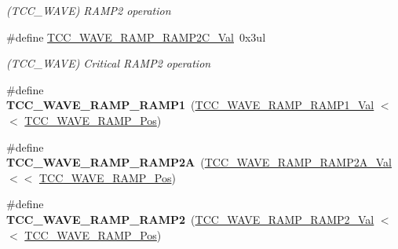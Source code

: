 \begin{DoxyCompactItemize}
\begin{DoxyCompactList}\small\item\em (T\+C\+C\+\_\+\+W\+A\+V\+E) R\+A\+M\+P2 operation \end{DoxyCompactList}\item 
\hypertarget{group___s_a_m_l21___t_c_c_gabe7904d0407ca7a3c78a7ac220e4e77a}{}\#define \hyperlink{group___s_a_m_l21___t_c_c_gabe7904d0407ca7a3c78a7ac220e4e77a}{T\+C\+C\+\_\+\+W\+A\+V\+E\+\_\+\+R\+A\+M\+P\+\_\+\+R\+A\+M\+P2\+C\+\_\+\+Val}~0x3ul\label{group___s_a_m_l21___t_c_c_gabe7904d0407ca7a3c78a7ac220e4e77a}

\begin{DoxyCompactList}\small\item\em (T\+C\+C\+\_\+\+W\+A\+V\+E) Critical R\+A\+M\+P2 operation \end{DoxyCompactList}\item 
\hypertarget{group___s_a_m_l21___t_c_c_ga45e677a9234ec6c18c8534bf488c6988}{}\#define {\bfseries T\+C\+C\+\_\+\+W\+A\+V\+E\+\_\+\+R\+A\+M\+P\+\_\+\+R\+A\+M\+P1}~(\hyperlink{group___s_a_m_l21___t_c_c_ga0fddbb1bb391e4ae73fb6e978d626fdf}{T\+C\+C\+\_\+\+W\+A\+V\+E\+\_\+\+R\+A\+M\+P\+\_\+\+R\+A\+M\+P1\+\_\+\+Val}       $<$$<$ \hyperlink{group___s_a_m_l21___t_c_c_ga6613e2e13c814033e2509897a20ee96c}{T\+C\+C\+\_\+\+W\+A\+V\+E\+\_\+\+R\+A\+M\+P\+\_\+\+Pos})\label{group___s_a_m_l21___t_c_c_ga45e677a9234ec6c18c8534bf488c6988}

\item 
\hypertarget{group___s_a_m_l21___t_c_c_ga906eee12c144cc0d40ca4b7360de566f}{}\#define {\bfseries T\+C\+C\+\_\+\+W\+A\+V\+E\+\_\+\+R\+A\+M\+P\+\_\+\+R\+A\+M\+P2\+A}~(\hyperlink{group___s_a_m_l21___t_c_c_ga39b1a663ed2f07f3c442b477a73b284c}{T\+C\+C\+\_\+\+W\+A\+V\+E\+\_\+\+R\+A\+M\+P\+\_\+\+R\+A\+M\+P2\+A\+\_\+\+Val}      $<$$<$ \hyperlink{group___s_a_m_l21___t_c_c_ga6613e2e13c814033e2509897a20ee96c}{T\+C\+C\+\_\+\+W\+A\+V\+E\+\_\+\+R\+A\+M\+P\+\_\+\+Pos})\label{group___s_a_m_l21___t_c_c_ga906eee12c144cc0d40ca4b7360de566f}

\item 
\hypertarget{group___s_a_m_l21___t_c_c_ga7f1bd022465eb7fbcdcd6510c9e9475f}{}\#define {\bfseries T\+C\+C\+\_\+\+W\+A\+V\+E\+\_\+\+R\+A\+M\+P\+\_\+\+R\+A\+M\+P2}~(\hyperlink{group___s_a_m_l21___t_c_c_gac027d349051870d126b5e8f50216e04d}{T\+C\+C\+\_\+\+W\+A\+V\+E\+\_\+\+R\+A\+M\+P\+\_\+\+R\+A\+M\+P2\+\_\+\+Val}       $<$$<$ \hyperlink{group___s_a_m_l21___t_c_c_ga6613e2e13c814033e2509897a20ee96c}{T\+C\+C\+\_\+\+W\+A\+V\+E\+\_\+\+R\+A\+M\+P\+\_\+\+Pos})\label{group___s_a_m_l21___t_c_c_ga7f1bd022465eb7fbcdcd6510c9e9475f}


\end{DoxyCompactItemize}
